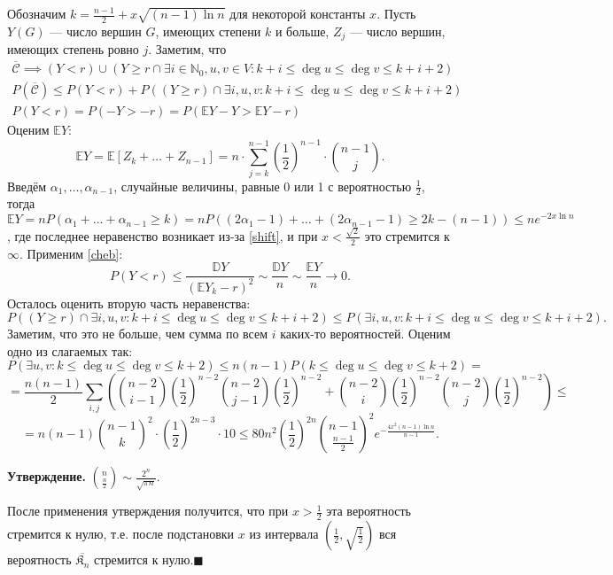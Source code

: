 \documentclass[a4paper,12pt]{article}
\newcommand*{\QEDA}{\hfill\ensuremath{\blacksquare}}
\begin{document}
Обозначим $k=\frac{n-1}2+x\sqrt{(n-1)\ln n}$ для некоторой константы $x$. Пусть $Y(G)$ --- число вершин $G$, имеющих степени $k$ и больше, $Z_j$ --- число вершин, имеющих степень ровно $j$. Заметим, что
\begin{align*}
	\overline{\mathcal C}\implies (Y<r)\cup (Y\geq r\cap \exists i\in\mathbb N_0,u,v\in V:k+i\leq \deg u\leq \deg v\leq k+i+2)\\
	P(\overline{\mathcal C})\leq P(Y<r)+P((Y\geq r)\cap \exists i,u,v:k+i\leq\deg u\leq\deg v\leq k+i+2)\\
	P(Y<r)=P(-Y>-r)=P(\mathbb EY-Y>\mathbb EY-r)
\end{align*}
Оценим $\mathbb EY$: \[
	\mathbb EY=\mathbb E[Z_k+\ldots+Z_{n-1}]=n\cdot\sum\limits_{j=k}^{n-1}\left(\frac12\right)^{n-1}\cdot\binom{n-1}j
	.\] Введём $\alpha_1,\ldots,\alpha_{n-1}$, случайные величины, равные 0 или 1 с вероятностью $\frac12$, тогда $\mathbb EY=nP(\alpha_1+\ldots+\alpha_{n-1}\geq k)=nP((2\alpha_1-1)+\ldots+(2\alpha_{n-1}-1)\geq 2k-(n-1))\leq ne^{-2x\ln n}$, где последнее неравенство возникает из-за \ref{shift}, и при $x<\frac{\sqrt2}{2}$ это стремится к $\infty$. Применим \ref{cheb}: \[
	P(Y<r)\leq\frac{\mathbb DY}{(\mathbb EY_k-r)^2}\sim \frac{\mathbb DY}n\sim \frac{\mathbb EY}n\to 0
.\] Осталось оценить вторую часть неравенства:
\[
	P((Y\geq r)\cap \exists i,u,v:k+i\leq\deg u\leq\deg v\leq k+i+2)\leq P(\exists i,u,v:k+i\leq\deg u\leq\deg v\leq k+i+2)
.\] Заметим, что это не больше, чем сумма по всем $i$ каких-то вероятностей. Оценим одно из слагаемых так: \[
P(\exists u,v:k\leq\deg u\leq\deg v\leq k+2)\leq n(n-1)P(k\leq\deg u\leq\deg v\leq k+2)=
\]\[
	=\frac{n(n-1)}2\sum\limits_{i,j}\left(\binom{n-2}{i-1}\left(\frac12\right)^{n-2}\binom{n-2}{j-1}\left(\frac12\right)^{n-2}+\binom{n-2}i\left(\frac12\right)^{n-2}\binom{n-2}j\left(\frac12\right)^{n-2}\right)\leq
\]\[
=n(n-1)\binom{n-1}k^2\cdot\left(\frac12\right)^{2n-3}\cdot10\leq80n^2\left(\frac{1}{2}\right)^{2n} \binom{n-1}{\frac{n-1}{2}}^2 e^{-\frac{4x^2(n-1)\ln n}{n-1}}
.\]

{\bf Утверждение.} $\binom{n}{\frac{n}{2}}\sim \frac{2^n}{\sqrt{\pi n}}$.

После применения утверждения получится, что при $x>\frac{1}{2}$ эта вероятность стремится к нулю, т.е. после подстановки $x$ из интервала $(\frac12,\sqrt{\frac12})$ вся вероятность $\overline{\mathfrak K_n}$ стремится к нулю.\QEDA 
\end{document}
